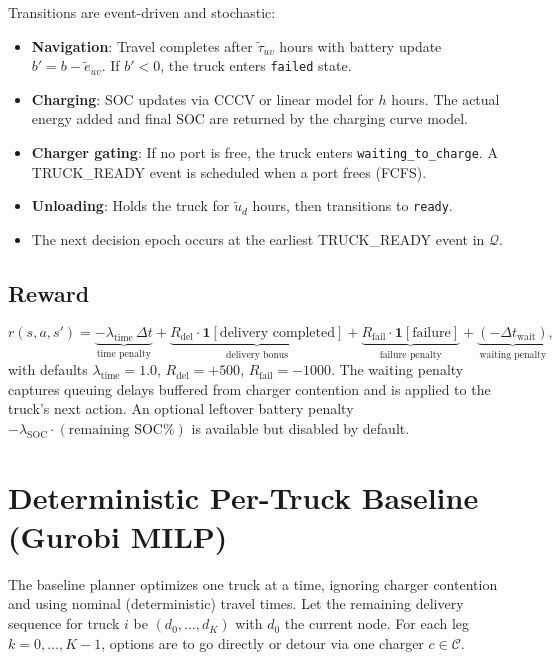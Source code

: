 \documentclass[11pt]{article}
\begin{document}
Transitions are event-driven and stochastic:
\begin{itemize}[nosep]
    \item \textbf{Navigation}: Travel completes after $\tilde{\tau}_{uv}$ hours with battery update $b'\!=\!b - \tilde{e}_{uv}$. If $b'<0$, the truck enters \texttt{failed} state.
    \item \textbf{Charging}: SOC updates via CCCV or linear model for $h$ hours. The actual energy added and final SOC are returned by the charging curve model.
    \item \textbf{Charger gating}: If no port is free, the truck enters \texttt{waiting\_to\_charge}. A \textsc{TRUCK\_READY} event is scheduled when a port frees (FCFS).
    \item \textbf{Unloading}: Holds the truck for $\tilde{u}_d$ hours, then transitions to \texttt{ready}.
    \item The next decision epoch occurs at the earliest \textsc{TRUCK\_READY} event in $\mathcal{Q}$.
\end{itemize}

\subsection{Reward}

\[
r(s,a,s') = \underbrace{-\lambda_{\text{time}}\,\Delta t}_{\text{time penalty}} + \underbrace{R_{\text{del}}\cdot\mathbf{1}[\text{delivery completed}]}_{\text{delivery bonus}} + \underbrace{R_{\text{fail}}\cdot\mathbf{1}[\text{failure}]}_{\text{failure penalty}} + \underbrace{(-\Delta t_{\text{wait}})}_{\text{waiting penalty}},
\]
with defaults $\lambda_{\text{time}}=1.0$, $R_{\text{del}}=+500$, $R_{\text{fail}}=-1000$. The waiting penalty captures queuing delays buffered from charger contention and is applied to the truck's next action. An optional leftover battery penalty $-\lambda_{\text{SOC}}\cdot(\text{remaining SOC}\%)$ is available but disabled by default.

\section{Deterministic Per-Truck Baseline (Gurobi MILP)}\label{sec:gurobi}

The baseline planner optimizes one truck at a time, ignoring charger contention and using nominal (deterministic) travel times. Let the remaining delivery sequence for truck $i$ be $(d_0,\dots,d_K)$ with $d_0$ the current node. For each leg $k=0,\dots,K-1$, options are to go directly or detour via one charger $c\in\mathcal{C}$.
\end{document}
